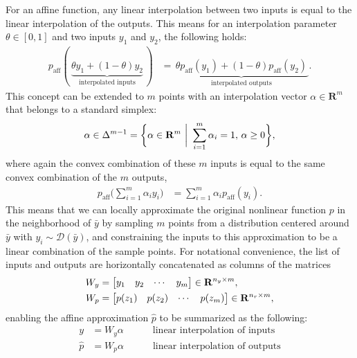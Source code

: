 For an affine function, any linear interpolation between two inputs is equal to the linear interpolation of the outputs. This means for an interpolation parameter $\theta \in [0, 1]$ and two inputs $y_1$ and $y_2$, the following holds:
\begin{align}
    p_\text{aff}(\,\underbrace{\theta y_1 + (1-\theta)y_2}_\text{interpolated inputs}\,) &= \underbrace{\,\theta p_\text{aff}(y_1) + (1 - \theta) p_\text{aff}(y_2)\,}_\text{interpolated outputs}.
\end{align}
This concept can be extended to $m$ points with an interpolation vector $\alpha \in \mathbf{R}^m$ that belongs to a standard simplex:
\begin{align}
    \alpha \in \Delta^{m-1} = \biggl\{  \alpha \in \mathbf{R}^{m} \,\,\bigg|\,\, \sum_{i=1}^m \alpha_i =1,\, \alpha \geq 0\biggl\},
\end{align}
where again the convex combination of these $m$ inputs is equal to the same convex combination of the $m$ outputs,
\begin{align}
    p_\text{aff}\bigg({\sum_{i=1}^m\alpha_i y_i}\bigg) &= {\sum_{i=1}^m \alpha_i p_\text{aff}(y_i)}.
\end{align}
This means that we can locally approximate the original nonlinear function $p$ in the neighborhood of $\bar{y}$ by sampling $m$ points from a distribution centered around $\bar{y}$ with $y_i \sim \mathcal{D}(\bar{y})$, and constraining the inputs to this approximation to be a linear combination of the sample points.  For notational convenience, the list of inputs and outputs are horizontally concatenated as columns of the matrices 
\begin{align}
    W_y &= \begin{bmatrix}
        y_1 & y_2 & \cdots & y_m
    \end{bmatrix} \in \mathbf{R}^{n_y \times m}, \\
    W_p &= \begin{bmatrix}
        p(z_1) & p(z_2) & \cdots & p(z_m)
    \end{bmatrix} \in \mathbf{R}^{n_r \times m}, 
\end{align}
enabling the affine approximation $\hat{p}$ to be summarized as the following:
\begin{align}
    y &= W_y \alpha \quad \quad \quad  \text{linear interpolation of inputs}\\ 
    \hat{p} &= W_p \alpha \quad \quad \quad  \text{linear interpolation of outputs}\label{btb:blend1}
\end{align}


